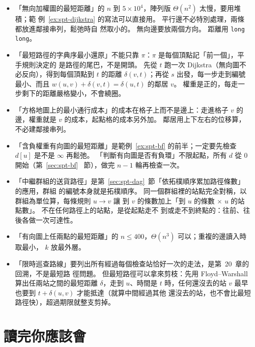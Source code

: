 \begin{itemize}
\item 「無向加權圖的最短距離」的 $n$ 到 $5 \times 10^4$，陣列版 $\Theta(n^2)$ 太慢，要用堆積；範
例~\ref{ex:spt-dijkstra} 的寫法可以直接用。 平行邊不必特別處理，兩條都放進鄰接串列，鬆弛時自
然取小的。 無向邊要放兩個方向。 距離用 \texttt{long long}。
\item 「最短路徑的字典序最小還原」不能只靠 $\pi$：$\pi$ 是每個頂點記「前一個」，平手規則決定的
是路徑的尾巴，不是開頭。 先從 $t$ 跑一次 Dijkstra（無向圖不必反向），得到每個頂點到 $t$ 的距離
$\delta(v, t)$；再從 $s$ 出發，每一步走到編號最小、而且 $w(u, v) + \delta(v, t) = \delta(u, t)$
的鄰居 $v$。 權重是正的，每走一步剩下的距離嚴格變小，不會繞圈。
\item 「方格地圖上的最小通行成本」的成本在格子上而不是邊上：走進格子 $v$ 的邊，權重就是 $v$
的成本，起點格的成本另外加。 鄰居用上下左右的位移算，不必建鄰接串列。
\item 「含負權重有向圖的最短距離」是範例~\ref{ex:spt-bf} 的前半；一定要先檢查 $d[u]$ 是不是
$\infty$ 再鬆弛。 「判斷有向圖是否有負環」不限起點，所有 $d$ 從 $0$ 開始（第~\ref{sec:spt-bf}~
節），做完 $n - 1$ 輪再檢查一次。
\item 「中繼群組的送貨路徑」是第~\ref{sec:spt-dag}~節「依拓樸順序累加路徑條數」的應用，群組
的編號本身就是拓樸順序。 同一個群組裡的站點完全對稱，以群組為單位算，每條規則 $u \to v$ 讓
到 $v$ 的條數加上「到 $u$ 的條數 $\times$ $u$ 的站點數」。 不在任何路徑上的站點，是從起點走不
到或走不到終點的：往前、往後各做一次可達性。
\item 「有向圖上任兩點的最短距離」的 $n \le 400$，$\Theta(n^3)$ 可以；重複的邊讀入時取最小，
$k$ 放最外層。
\item 「限時巡查路線」要列出所有經過每個檢查站恰好一次的走法，是第~20~章的回溯，不是最短路
徑問題。 但最短路徑可以拿來剪枝：先用 Floyd--Warshall 算出任兩站之間的最短距離 $\delta$，走到
$u$、時間是 $t$ 時，任何還沒去的站 $v$ 最早也要到 $t + \delta(u, v)$ 才能抵達（就算中間經過其他
還沒去的站，也不會比最短路徑快），超過期限就整支剪掉。
\end{itemize}

\section{讀完你應該會}
\label{sec:spt-checklist}

